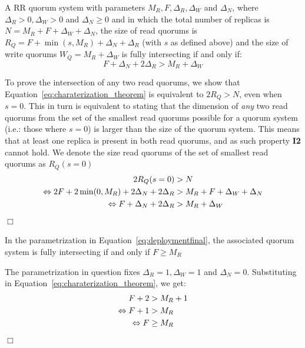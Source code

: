 {\begin{theorem} \label{theorem:fully_intersecting}
    A \ac{RR} quorum system with parameters $M_R, F,
    \Delta_R, \Delta_W$ and $\Delta_N$, where $\Delta_R > 0,
    \Delta_W > 0$ and $\Delta_N \geq 0$ and in which the
    total number of replicas is $N = M_R + F + \Delta_W +
    \Delta_N$, the size of read quorums is $R_Q = F + \min(s,
    M_R) + \Delta_N + \Delta_R$ (with $s$ as defined above)
    and the size of write quorums $W_Q = M_R + \Delta_W$ is
    fully intersecting if and only if:
    \begin{equation}\label{eq:charaterization_theorem}
        F + \Delta_N + 2 \Delta_R > M_R + \Delta_W
    \end{equation}
\end{theorem}
\begin{dem}
    To prove the intersection of any two read quorums, we
    show that Equation~\ref{eq:charaterization_theorem} is equivalent to
    $2 R_Q > N$, even when $s = 0$. This in turn is equivalent to
    stating that the dimension of \emph{any} two read quorums from the
    set of the smallest read quorums possible for a quorum
    system (i.e.: those where $s = 0$) is larger than the
    size of the quorum system. This means that at least one
    replica is present in both read quorums, and as such
    property \textbf{I2} cannot hold. We denote the size read quorums
    of the set of smallest read quorums as $R_Q(s = 0)$
    \begin{align*}
        2 R_Q (s = 0) &> N  \\
        \Leftrightarrow 2F + 2\min(0, M_R) + 2\Delta_N + 2\Delta_R &> M_R + F + \Delta_W + \Delta_N  \\
        \Leftrightarrow F + \Delta_N + 2\Delta_R &> M_R + \Delta_W \\
    \end{align*}
    \hfill\ensuremath{\Box}\vspace{2em}
\end{dem}

\begin{corollary}
    In the parametrization in
    Equation~\ref{eq:deploymentfinal}, the associated quorum
    system is fully intersecting if and only if $F \geq M_R$
\end{corollary}
\begin{dem}
    The parametrization in question fixes $\Delta_R = 1,
    \Delta_W = 1$ and $\Delta_N = 0$. Substituting in
    Equation~\ref{eq:charaterization_theorem}, we get:
    \begin{align*}
        F + 2 &> M_R + 1 \\
        \Leftrightarrow F + 1 &> M_R \\
        \Leftrightarrow F &\geq M_R
    \end{align*}
    \hfill\ensuremath{\Box}\vspace{2em}
\end{dem}
}


